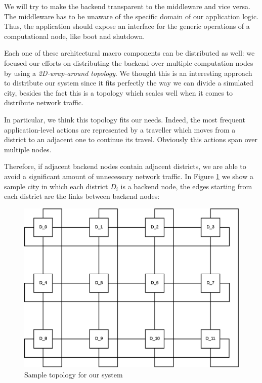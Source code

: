 We will try to make the backend transparent to the middleware and vice versa.
The middleware has to be unaware
of the specific domain of our application logic.
Thus, the application should expose an interface for the generic operations of
a computational node, like boot and shutdown.

Each one of these architectural macro components can be distributed as well: we
focused our efforts on distributing the backend over multiple computation nodes
by using a \textit{2D-wrap-around topology}.
We thought this is an interesting approach to distribute our system since it
fits perfectly the way we can divide a simulated city, besides the fact this is
a topology which scales well when it comes to distribute network traffic.

In particular, we think this topology fits our needs. Indeed, the
most frequent application-level actions are
represented by a traveller which moves from a district to an
adjacent one to continue its travel. Obviously this actions span over
multiple nodes.

Therefore, if adjacent backend nodes contain adjacent districts, we are able to
avoid a significant amount of unnecessary network traffic. In Figure
\ref{fig:sd-sys-arch-topology} we show a sample city in which each district
$D_i$ is a backend node, the edges starting from each district are the links
between backend nodes:

\begin{figure}[H]
  \centering
  \includegraphics[scale=0.5,keepaspectratio]
    {images/solution/topology.eps}
  \caption{Sample topology for our system}
  \label{fig:sd-sys-arch-topology}
\end{figure}


